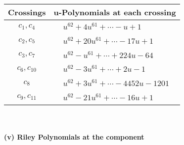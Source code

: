 \documentclass[1p]{elsarticle_modified}
\theoremstyle{definition}
\begin{document}
\begin{tabular}{m{50pt}|m{274pt}}
Crossings & \hspace{64pt}u-Polynomials at each crossing \\
\hline $$\begin{aligned}c_{1},c_{4}\end{aligned}$$&$\begin{aligned}
&u^{62}+4 u^{61}+\cdots- u+1
\end{aligned}$\\
\hline $$\begin{aligned}c_{2},c_{5}\end{aligned}$$&$\begin{aligned}
&u^{62}+20 u^{61}+\cdots-17 u+1
\end{aligned}$\\
\hline $$\begin{aligned}c_{3},c_{7}\end{aligned}$$&$\begin{aligned}
&u^{62}- u^{61}+\cdots+224 u-64
\end{aligned}$\\
\hline $$\begin{aligned}c_{6},c_{10}\end{aligned}$$&$\begin{aligned}
&u^{62}-3 u^{61}+\cdots+2 u-1
\end{aligned}$\\
\hline $$\begin{aligned}c_{8}\end{aligned}$$&$\begin{aligned}
&u^{62}+3 u^{61}+\cdots-4452 u-1201
\end{aligned}$\\
\hline $$\begin{aligned}c_{9},c_{11}\end{aligned}$$&$\begin{aligned}
&u^{62}-21 u^{61}+\cdots-16 u+1
\end{aligned}$\\
\hline
\end{tabular}\\~\\
\newpage\renewcommand{\arraystretch}{1}
\flushleft \textbf{(v) Riley Polynomials at the component}\newline \\
\end{document}
